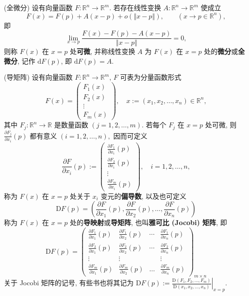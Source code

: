 \begin{definition}{(全微分)}
设有向量函数 $F:\mathbb{R}^{n}\rightarrow\mathbb{R}^{m}$. 若存在线性变换 $A:\mathbb{R}^{n}\rightarrow\mathbb{R}^{m}$
使成立
\[
F(x)=F(p)+A(x-p)+o(\left\Vert x-p\right\Vert ),\quad\quad(x\rightarrow p\in\mathbb{R}^{n}),
\]
即
\[
{\displaystyle \lim_{x\rightarrow p}{\displaystyle \frac{F(x)-F(p)-A(x-p)}{\left\Vert x-p\right\Vert }=0,}}
\]
则称 $F(x)$ 在 $x=p$ 处\textbf{可微}, 并称线性变换 $A$ 为 $F(x)$ 在 $x=p$ 处的\textbf{微分}或\textbf{全微分},
记作 $\mathrm{d}F(p)$, 即 $\mathrm{d}F(p)=A.$ 
\end{definition}

\begin{definition}{(导矩阵)}
设有向量函数 $F:\mathbb{R}^{n}\rightarrow\mathbb{R}^{m}$, $F$ 可表为分量函数形式
$$
F(x)=\left(\begin{array}{c}
F_{1}(x)\\
F_{2}(x)\\
\vdots\\
F_{m}(x)
\end{array}\right),\quad x:=(x_{1},x_{2},\ldots,x_{n})\in\mathbb{R}^{n},
$$
其中 $F_{j}:\mathbb{R}^{n}\rightarrow\mathbb{R}$ 是数量函数 $(j=1,2,\ldots,m)$.
若每个 $F_{j}$ 在 $x=p$ 处可微, 则 ${\displaystyle \frac{\partial F_{j}}{\partial x_{i}}(p)}$
都有意义 $(i=1,2,\ldots,n),$ 因而可定义
$$
{\displaystyle \frac{\partial F}{\partial x_{i}}(p):=\left(\begin{array}{c}
\frac{\partial F_{1}}{\partial x_{i}}(p)\\
\frac{\partial F_{2}}{\partial x_{i}}(p)\\
\vdots\\
\frac{\partial F_{m}}{\partial x_{i}}(p)
\end{array}\right),\quad i=1,2,\ldots,n,}
$$
称为 $F(x)$ 在 $x=p$ 处关于 $x_{i}$ 变元的\textbf{偏导数}, 以及也可定义
\[
\mathrm{D}F(p)=(\frac{\partial F}{\partial x_{1}}(p),\frac{\partial F}{\partial x_{2}}(p),\ldots,\frac{\partial F}{\partial x_{n}}(p))
\]
称为 $F(x)$ 在 $x=p$ 处的\textbf{导映射}或\textbf{导矩阵}, 也叫\textbf{雅可比 (Jocobi)
矩阵}, 即
$$
\mathrm{D}F(p)=\left(\begin{array}{cccc}
\frac{\partial F_{1}}{\partial x_{1}}(p) & \frac{\partial F_{1}}{\partial x_{2}}(p) & \cdots & \frac{\partial F_{1}}{\partial x_{n}}(p)\\
\frac{\partial F_{2}}{\partial x_{1}}(p) & \frac{\partial F_{2}}{\partial x_{2}}(p) & \cdots & \frac{\partial F_{2}}{\partial x_{n}}(p)\\
\vdots & \vdots &  & \vdots\\
\frac{\partial F_{m}}{\partial x_{1}}(p) & \frac{\partial F_{m}}{\partial x_{2}}(p) & \ldots & \frac{\partial F_{m}}{\partial x_{n}}(p)
\end{array}\right)_{m\times n}
$$
关于 Jocobi 矩阵的记号, 有些书也将其记为 $\mathrm{D}F(p):={\displaystyle \left.\frac{\mathrm{D}(F_{1},F_{2},\ldots,F_{m})}{\mathrm{D}(x_{1},x_{2},\ldots,x_{n})}\right|_{x=p}.}$
\end{definition}



